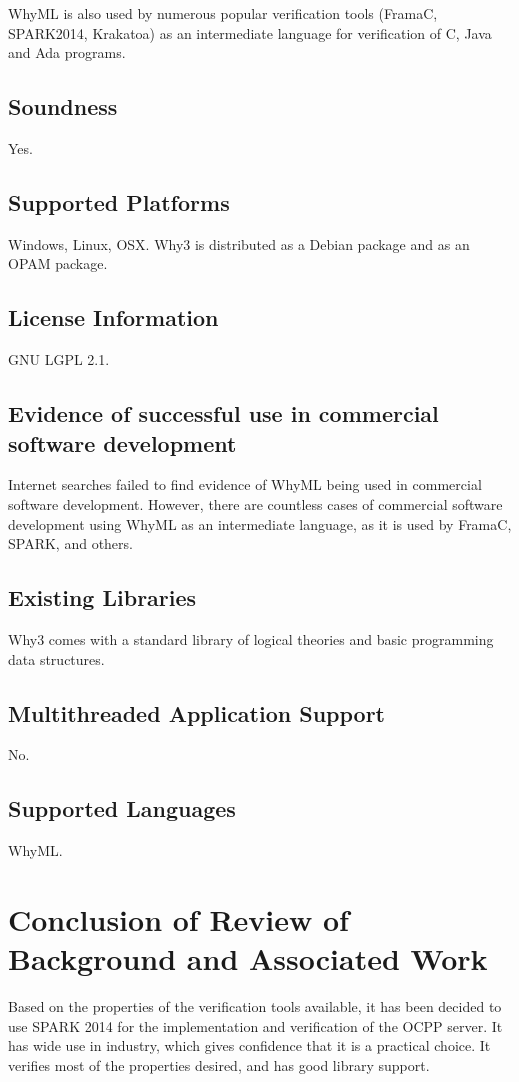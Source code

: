 \documentclass[12pt,openany,a4paper]{book}
\begin{document}
	WhyML is also used by numerous popular verification tools (FramaC, SPARK2014, Krakatoa) as an intermediate language for verification of C, Java and Ada programs.
	\subsection{Soundness}
	Yes.
	\subsection{Supported Platforms}
	Windows, Linux, OSX. Why3 is distributed as a Debian package and as an OPAM package.
	
	\subsection{License Information}
	GNU LGPL 2.1.
	\subsection{Evidence of successful use in commercial software development}
		Internet searches failed to find evidence of WhyML being used in commercial software development. However, there are countless cases of commercial software development using WhyML as an intermediate language, as it is used by FramaC, SPARK, and others.
 
	\subsection{Existing Libraries}
	Why3 comes with a standard library of logical theories and basic programming data structures.
	\subsection{Multithreaded Application Support}
	No.
	\subsection{Supported Languages}
	WhyML.

\section{Conclusion of Review of Background and Associated Work}
Based on the properties of the verification tools available, it has been decided to use SPARK 2014 for the implementation and verification of the OCPP server. It has wide use in industry, which gives confidence that it is a practical choice. It verifies most of the properties desired, and has good library support.
\end{document}
